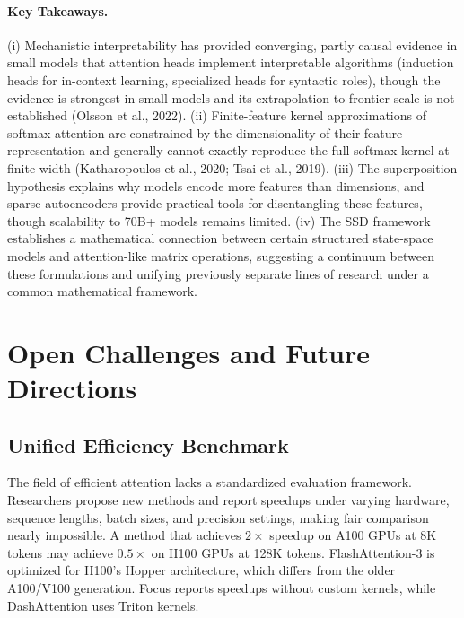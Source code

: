 \documentclass[10pt,twocolumn]{article}
\begin{document}
\paragraph{Key Takeaways.} (i) Mechanistic interpretability has provided converging, partly causal evidence in small models that attention heads implement interpretable algorithms (induction heads for in-context learning, specialized heads for syntactic roles), though the evidence is strongest in small models and its extrapolation to frontier scale is not established (Olsson et al., 2022). (ii) Finite-feature kernel approximations of softmax attention are constrained by the dimensionality of their feature representation and generally cannot exactly reproduce the full softmax kernel at finite width (Katharopoulos et al., 2020; Tsai et al., 2019). (iii) The superposition hypothesis explains why models encode more features than dimensions, and sparse autoencoders provide practical tools for disentangling these features, though scalability to 70B+ models remains limited. (iv) The SSD framework establishes a mathematical connection between certain structured state-space models and attention-like matrix operations, suggesting a continuum between these formulations and unifying previously separate lines of research under a common mathematical framework.

\section{Open Challenges and Future Directions}\label{open-challenges-and-future-directions}

\subsection{Unified Efficiency Benchmark}\label{unified-efficiency-benchmark}

The field of efficient attention lacks a standardized evaluation framework. Researchers propose new methods and report speedups under varying hardware, sequence lengths, batch sizes, and precision settings, making fair comparison nearly impossible. A method that achieves $2 \times $ speedup on A100 GPUs at 8K tokens may achieve $0.5 \times $ on H100 GPUs at 128K tokens. FlashAttention-3 is optimized for H100's Hopper architecture, which differs from the older A100/V100 generation. Focus reports speedups without custom kernels, while DashAttention uses Triton kernels.
\end{document}
